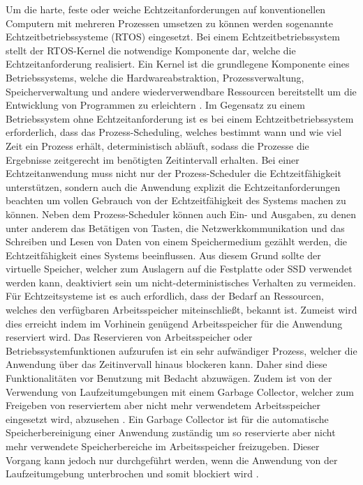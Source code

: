 Um die harte, feste oder weiche Echtzeitanforderungen auf konventionellen Computern mit mehreren Prozessen umsetzen zu können werden sogenannte Echtzeitbetriebssysteme (RTOS) eingesetzt. Bei einem Echtzeitbetriebssystem stellt der RTOS-Kernel die notwendige Komponente dar, welche die Echtzeitanforderung realisiert\cite[343\psq]{worn_echtzeitsysteme_2006}. Ein Kernel ist die grundlegene Komponente eines Betriebssystems, welche die Hardwareabstraktion, Prozessverwaltung, Speicherverwaltung und andere wiederverwendbare Ressourcen bereitstellt um die Entwicklung von Programmen zu erleichtern \cite[356]{worn_echtzeitsysteme_2006}. Im Gegensatz zu einem Betriebssystem ohne Echtzeitanforderung ist es bei einem Echtzeitbetriebssystem erforderlich, dass das Prozess-Scheduling, welches bestimmt wann und wie viel Zeit ein Prozess erhält, deterministisch abläuft, sodass die Prozesse die Ergebnisse zeitgerecht im benötigten Zeitintervall erhalten. Bei einer Echtzeitanwendung muss nicht nur der Prozess-Scheduler die Echtzeitfähigkeit unterstützen, sondern auch die Anwendung explizit die Echtzeitanforderungen beachten um vollen Gebrauch von der Echtzeitfähigkeit des Systems machen zu können. Neben dem Prozess-Scheduler können auch Ein- und Ausgaben, zu denen unter anderem das Betätigen von Tasten, die Netzwerkkommunikation und das Schreiben und Lesen von Daten von einem Speichermedium gezählt werden, die Echtzeitfähigkeit eines Systems beeinflussen. Aus diesem Grund sollte der virtuelle Speicher, welcher zum Auslagern auf die Festplatte oder SSD verwendet werden kann, deaktiviert sein um nicht-deterministisches Verhalten zu vermeiden. Für Echtzeitsysteme ist es auch erfordlich, dass der Bedarf an Ressourcen, welches den verfügbaren Arbeitsspeicher miteinschließt, bekannt ist. Zumeist wird dies erreicht indem im Vorhinein genügend Arbeitsspeicher für die Anwendung reserviert wird. Das Reservieren von Arbeitsspeicher oder Betriebssystemfunktionen aufzurufen ist ein sehr aufwändiger Prozess, welcher die Anwendung über das Zeitinvervall hinaus blockeren kann. Daher sind diese Funktionalitäten vor Benutzung mit Bedacht abzuwägen. Zudem ist von der Verwendung von Laufzeitumgebungen mit einem Garbage Collector, welcher zum Freigeben von reserviertem aber nicht mehr verwendetem Arbeitsspeicher eingesetzt wird, abzusehen \cite{noauthor_echtzeitsystem_2020}. Ein Garbage Collector ist für die automatische Speicherbereinigung einer Anwendung zuständig um so reservierte aber nicht mehr verwendete Speicherbereiche im Arbeitsspeicher freizugeben. Dieser Vorgang kann jedoch nur durchgeführt werden, wenn die Anwendung von der Laufzeitumgebung unterbrochen und somit blockiert wird \cite{noauthor_garbage_collector_2020}.

